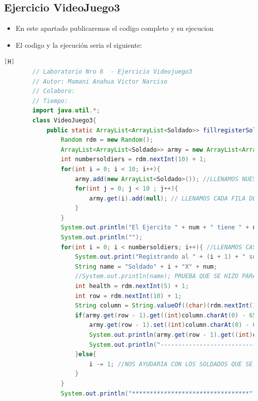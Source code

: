 \documentclass{article}
\begin{document}
	\subsection{Ejercicio VideoJuego3}
	\begin{itemize}	
		\item En este apartado publicaremos el codigo completo y su ejecucion 
		\item El codigo y la ejecución seria el siguiente:
	\end{itemize}	
	\begin{lstlisting}[language=java,caption={Las lineas de codigo :}][H]
		// Laboratorio Nro 6  - Ejercicio Videojuego3
		// Autor: Mamani Anahua Victor Narciso
		// Colaboro:
		// Tiempo:
		import java.util.*;
		class VideoJuego3{
			public static ArrayList<ArrayList<Soldado>> fillregisterSoldiers(int num){
				Random rdm = new Random();
				ArrayList<ArrayList<Soldado>> army = new ArrayList<ArrayList<Soldado>>();
				int numbersoldiers = rdm.nextInt(10) + 1;
				for(int i = 0; i < 10; i++){
					army.add(new ArrayList<Soldado>()); //LLENAMOS NUESTROS ARRAYLIST BIDIMENSIONAL CON CADA FILA PARA QUE CUMPLAN CON ESTRUCTURA DEL TABLERO
					for(int j = 0; j < 10 ; j++){
						army.get(i).add(null); // LLENAMOS CADA FILA DEL ARRAYLIST CON UN OBJETO SOLDADO CON TAL QUE ESTE SEA NULL PARA QUE SEPA QUE ESTE TIENE UNA CASILLA PERO NO HAY NADIE TODAVIA SE PUEDE LLENAR 
					}
				}
				System.out.println("El Ejercito " + num + " tiene " + numbersoldiers + " soldados : " ); 
				System.out.println("");
				for(int i = 0; i < numbersoldiers; i++){ //LLENAMOS CASILLAS CON CADA SOLDADO CREADO ALEATORIAMENTE
					System.out.print("Registrando al " + (i + 1) + " soldado del Ejercito " + num + "");
					String name = "Soldado" + i + "X" + num;
					//System.out.println(name); PRUEBA QUE SE HIZO PARA VER LOS NOMBRES
					int health = rdm.nextInt(5) + 1;
					int row = rdm.nextInt(10) + 1;
					String column = String.valueOf((char)(rdm.nextInt(10) + 65)); //REUTILIZAMOS CODIGO DEL ANTERIOR ARCHIVO VIDEOJUEGO2.JAVA YA QUE TENDRIAN LA MISMA FUNCIONALIDAD
					if(army.get(row - 1).get((int)column.charAt(0) - 65) == null){
						army.get(row - 1).set((int)column.charAt(0) - 65, new Soldado(name, health, row, column));
						System.out.println(army.get(row - 1).get((int)column.charAt(0) - 65).toString());
						System.out.println("---------------------------------");
					}else{
						i -= 1; //NOS AYUDARIA CON LOS SOLDADOS QUE SE REPITEN EN EL MISMO CASILLERO CON TAL QUE NO DEBERIA CONTAR 
					}
				}
				System.out.println("*********************************");

\end{lstlisting}
\end{document}
